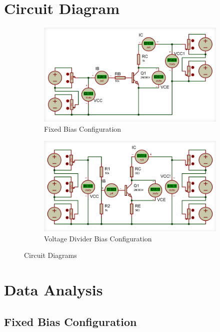 \documentclass[12pt]{article}
\begin{document}
\section{Circuit Diagram}
\begin{figure}[h!]
    \centering
    \begin{subfigure}{0.45\textwidth}
        \includegraphics[width=0.9\linewidth]{Fixed_Bias.png}
        \caption{Fixed Bias Configuration}
    \end{subfigure}
    \begin{subfigure}{0.45\textwidth}
        \includegraphics[width=0.9\linewidth]{Voltage_Divider_Bias.png}
        \caption{Voltage Divider Bias Configuration}
    \end{subfigure}
    \caption{Circuit Diagrams}
\end{figure}

\newpage
\section{Data Analysis}
\subsection{Fixed Bias Configuration}
\end{document}

